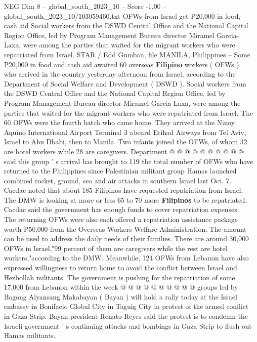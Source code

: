 \begin{textsample}{NEG Dim 8 – global\_south\_2023\_10 – Score -1.00 – global\_south\_2023\_10/103059460.txt}  \label{ex:f8_neg_091}
OFWs from Israel get P20,000 in food, cash aid Social workers from the DSWD Central Office and the National Capital Region Office, led by Program Management Bureau director Miramel Garcia-Laxa, were among the parties that waited for the migrant workers who were repatriated from Israel.
STAR / Edd Gumban, file MANILA, Philippines -- Some P20,000 in food and cash aid awaited 60 overseas \textbf{Filipino} workers ( OFWs ) who arrived in the country yesterday afternoon from Israel, according to the Department of Social Welfare and Development ( DSWD ).
Social workers from the DSWD Central Office and the National Capital Region Office, led by Program Management Bureau director Miramel Garcia-Laxa, were among the parties that waited for the migrant workers who were repatriated from Israel.
The 60 OFWs were the fourth batch who came home.
They arrived at the Ninoy Aquino International Airport Terminal 3 aboard Etihad Airways from Tel Aviv, Israel to Abu Dhabi, then to Manila.
Two infants joined the OFWs, of whom 32 are hotel workers while 28 are caregivers.
Department @ @ @ @ @ @ @ @ @ @ said this group ' s arrival has brought to 119 the total number of OFWs who have returned to the Philippines since Palestinian militant group Hamas launched combined rocket, ground, sea and air attacks in southern Israel last Oct. 7.
Cacdac noted that about 185 Filipinos have requested repatriation from Israel.
The DMW is looking at more or less 65 to 70 more \textbf{Filipinos} to be repatriated.
Cacdac said the government has enough funds to cover repatriation expenses.
The returning OFWs were also each offered a repatriation assistance package worth P50,000 from the Overseas Workers Welfare Administration.
The amount can be used to address the daily needs of their families.
There are around 30,000 OFWs in Israel,"99 percent of them are caregivers while the rest are hotel workers,"according to the DMW.
Meanwhile, 124 OFWs from Lebanon have also expressed willingness to return home to avoid the conflict between Israel and Hezbollah militants.
The government is pushing for the repatriation of some 17,000 from Lebanon within the week @ @ @ @ @ @ @ @ @ @ groups led by Bagong Alyansang Makabayan ( Bayan ) will hold a rally today at the Israel embassy in Bonifacio Global City in Taguig City in protest of the armed conflict in Gaza Strip.
Bayan president Renato Reyes said the protest is to condemn the Israeli government ' s continuing attacks and bombings in Gaza Strip to flush out Hamas militants.

\end{textsample}
